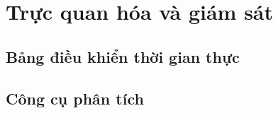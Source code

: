 \chapter{Trực quan hóa và giám sát}
\section{Bảng điều khiển thời gian thực}
\section{Công cụ phân tích}